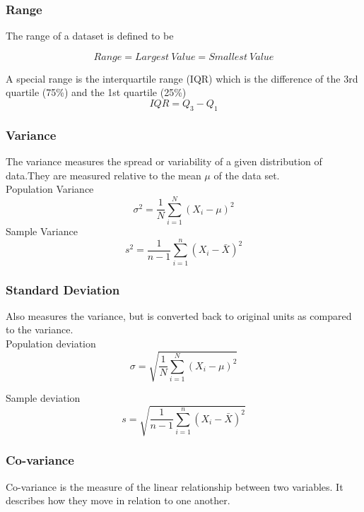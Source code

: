 \documentclass{article}
\begin{document}
\subsubsection{Range}
The range of a dataset is defined to be

\begin{equation}
Range = Largest\:Value = Smallest\:Value
\end{equation}

A special range is the interquartile range (IQR) which is the difference of the 3rd quartile (75\%) and the 1st quartile (25\%)
\begin{equation}
IQR = Q_3 - Q_1
\end{equation}

\subsubsection{Variance}
The variance measures the spread or variability of a given distribution of data.They are measured relative to the mean $\mu$ of the data set.\\

Population Variance
\begin{equation}
\sigma^2 = \frac{1}{N}\displaystyle\sum_{i=1}^{N}(X_i - \mu)^2
\end{equation}
Sample Variance
\begin{equation}
s^2 = \frac{1}{n-1}\displaystyle\sum_{i=1}^{n}(X_i - \bar{X})^2
\end{equation}

\subsubsection{Standard Deviation}
Also measures the variance, but is converted back to original units as compared to the variance.
\\

Population deviation
\begin{equation}
\sigma = \sqrt{\frac{1}{N }\displaystyle\sum_{i=1}^{N}(X_i - \mu)^2}
\end{equation}

Sample deviation
\begin{equation}
s = \sqrt{\frac{1}{n - 1}\displaystyle\sum_{i=1}^{n}(X_i - \bar{X})^2}
\end{equation}

\subsubsection{Co-variance}
Co-variance is the measure of the linear relationship between two variables. It describes how they move in relation to one another.
\\
\end{document}
